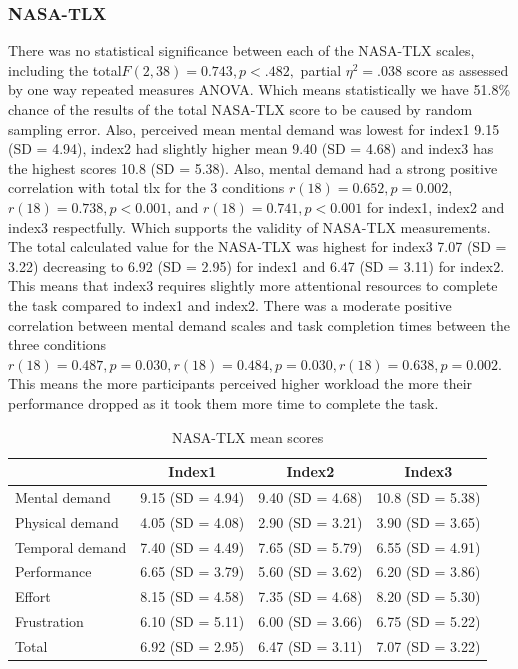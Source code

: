 \documentclass[a4paper]{report}
\begin{document}
			\subsubsection{NASA-TLX}
				There was no statistical significance between each of the NASA-TLX scales, including the total$F(2,38)=0.743, p<.482,$ partial $\eta^{2}=.038$ score as assessed by one way repeated measures ANOVA. Which means statistically we have 51.8\% chance of the results of the total NASA-TLX score to be caused by random sampling error. Also, perceived mean mental demand was lowest for index1 9.15 (SD = 4.94), index2 had slightly higher mean 9.40 (SD = 4.68) and index3 has the highest scores 10.8 (SD = 5.38). Also, mental demand had a strong positive correlation with total tlx for the 3 conditions $r(18)=0.652, p=0.002$, $r(18)=0.738, p<0.001$, and $r(18)=0.741, p<0.001$ for index1, index2 and index3 respectfully. Which supports the validity of NASA-TLX measurements. The total calculated value for the NASA-TLX was highest for index3 7.07 (SD = 3.22) decreasing to 6.92 (SD = 2.95) for index1 and 6.47 (SD = 3.11) for index2. This means that index3 requires slightly more attentional resources to complete the task compared to index1 and index2.
				There was a moderate positive correlation between mental demand scales and task completion times between the three conditions  $r(18)=0.487, p=0.030,  r(18)=0.484, p=0.030,  r(18)=0.638, p=0.002$. This means the more participants perceived higher workload the more their performance dropped as it took them more time to complete the task.
				\begin{table}[h]
					\centering
					\caption{NASA-TLX mean scores}
					\label{my-label}
					\begin{tabular}{l|ccc}
						& Index1           & Index2           & Index3           \\[0.12cm]   \hline
						Mental demand   & 9.15 (SD = 4.94) & 9.40 (SD = 4.68) & 10.8 (SD = 5.38) \\
						Physical demand & 4.05 (SD = 4.08) & 2.90 (SD = 3.21) & 3.90 (SD = 3.65) \\
						Temporal demand & 7.40 (SD = 4.49)  & 7.65 (SD = 5.79) & 6.55 (SD = 4.91) \\
						Performance     & 6.65 (SD = 3.79) & 5.60 (SD = 3.62)  & 6.20 (SD = 3.86)  \\
						Effort          & 8.15 (SD = 4.58) & 7.35 (SD = 4.68) & 8.20 (SD = 5.30)   \\
						Frustration     & 6.10 (SD = 5.11)  & 6.00 (SD = 3.66)  & 6.75 (SD = 5.22) \\\hline
						Total 			& 6.92 (SD = 2.95) & 6.47 (SD = 3.11) & 7.07 (SD = 3.22)
					\end{tabular}
				\end{table}
	
\end{document}
